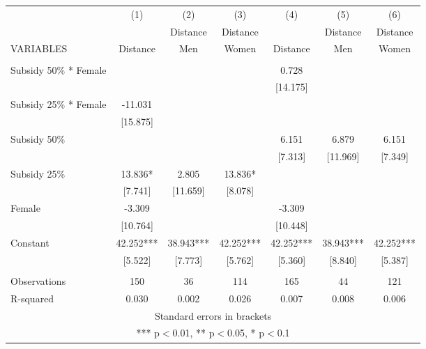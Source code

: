 \begin{tabular}{lcccccc} \hline
 & (1) & (2) & (3) & (4) & (5) & (6) \\
 &  & Distance & Distance &  & Distance & Distance \\
VARIABLES & Distance & Men & Women & Distance & Men & Women \\ \hline
 &  &  &  &  &  &  \\
Subsidy 50\% * Female &  &  &  & 0.728 &  &  \\
 &  &  &  & [14.175] &  &  \\
Subsidy 25\% * Female & -11.031 &  &  &  &  &  \\
 & [15.875] &  &  &  &  &  \\
Subsidy 50\% &  &  &  & 6.151 & 6.879 & 6.151 \\
 &  &  &  & [7.313] & [11.969] & [7.349] \\
Subsidy 25\% & 13.836* & 2.805 & 13.836* &  &  &  \\
 & [7.741] & [11.659] & [8.078] &  &  &  \\
Female & -3.309 &  &  & -3.309 &  &  \\
 & [10.764] &  &  & [10.448] &  &  \\
Constant & 42.252*** & 38.943*** & 42.252*** & 42.252*** & 38.943*** & 42.252*** \\
 & [5.522] & [7.773] & [5.762] & [5.360] & [8.840] & [5.387] \\
 &  &  &  &  &  &  \\
Observations & 150 & 36 & 114 & 165 & 44 & 121 \\
 R-squared & 0.030 & 0.002 & 0.026 & 0.007 & 0.008 & 0.006 \\ \hline
\multicolumn{7}{c}{ Standard errors in brackets} \\
\multicolumn{7}{c}{ *** p$<$0.01, ** p$<$0.05, * p$<$0.1} \\
\end{tabular}
